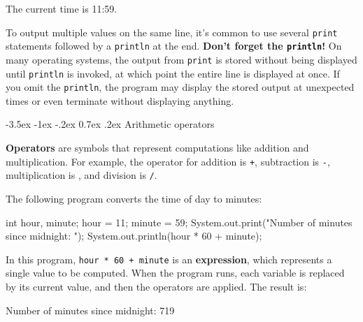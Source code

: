 \documentclass[12pt]{book}
\makeatletter
\renewcommand{\section}{\@startsection {section}{1}{\z@}%
    {-3.5ex \@plus -1ex \@minus -.2ex}%
    {0.7ex \@plus.2ex}%
    {\normalfont\Large\bfseries}}
\theoremstyle{exercise}
\newcommand{\java}[1]{\lstinline{#1}} %
\makeatother
\begin{document}
\begin{stdout}
The current time is 11:59.
\end{stdout}

To output multiple values on the same line, it's common to use several \java{print} statements followed by a \java{println} at the end.
{\bf Don't forget the \java{println}!}
On many operating systems, the output from \java{print} is stored without being displayed until \java{println} is invoked, at which point the entire line is displayed at once.
If you omit the \java{println}, the program may display the stored output at unexpected times or even terminate without displaying anything.


\section{Arithmetic operators}
\label{sec:arithops}



{\bf Operators} are symbols that represent computations like addition and multiplication.
For example, the operator for addition is {\tt +}, subtraction is {\tt -}, multiplication is {\tt *}, and division is {\tt /}.

The following program converts the time of day to minutes:

\begin{code}
    int hour, minute;
    hour = 11;
    minute = 59;
    System.out.print("Number of minutes since midnight: ");
    System.out.println(hour * 60 + minute);
\end{code}


In this program, \java{hour * 60 + minute} is an {\bf expression}, which represents a single value to be computed.
When the program runs, each variable is replaced by its current value, and then the operators are applied.
The result is:

\begin{stdout}
Number of minutes since midnight: 719
\end{stdout}
\end{document}
